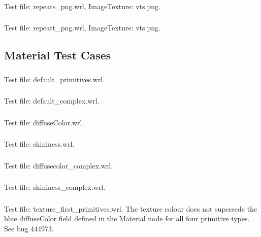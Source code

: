 \subsubsection{\ITAG}
Test file: repeats\_png.wrl, ImageTexture: vts.png.

\subsubsection{\ITAH}
Test file: repeatt\_png.wrl, ImageTexture: vts.png.

\subsection{Material Test Cases}

\subsubsection{\MatA}
Test file: default\_primitives.wrl.

\subsubsection{\MatB}
Test file: default\_complex.wrl.

\subsubsection{\MatC}
Test file: diffuseColor.wrl.

\subsubsection{\MatD}
Test file: shininess.wrl.

\subsubsection{\MatE}
Test file: diffusecolor\_complex.wrl.

\subsubsection{\MatF}
Test file: shininess\_complex.wrl.

\subsubsection{\MatGa\MatGb}
\label{sec:pref-colour}
Test file: texture\_first\_primitives.wrl.\newline
The texture colour does not supersede the blue diffuseColor field defined in the Material
node for all four primitive types.
See bug 444973.

